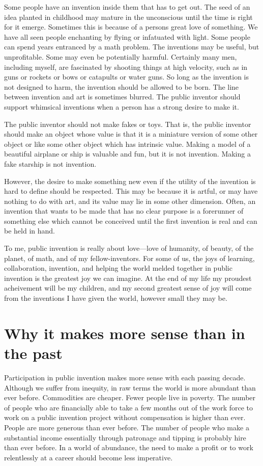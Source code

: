 \documentclass[
	fontsize=10pt, %
	twoside=false, %
	secnumdepth=1, %
]{kaobook}
\begin{document}
Some people have an invention inside them that has to get out.
The seed of an idea planted in childhood may mature in the unconscious
until the time is right for it emerge.
Sometimes this is because of a persons great love of something.
We have all seen people enchanting by flying or
infatuated with light.
Some people can spend years entranced by a math problem.
The inventions may be useful, but unprofitable.
Some may even be potentially harmful. Certainly many men,
including myself, are fascinated by shooting things at
high velocity, such as in guns or rockets or bows
or catapults or water guns.
So long as the invention is not designed to harm,
the invention should be allowed to be born.
The line between invention and art is sometimes blurred.
The public inventor should support whimsical inventions
when a person has a strong desire to make it.

The public inventor should not make fakes or toys.
That is, the public inventor should make an object
whose value is that it is a miniature version of some
other object or like some other object which has intrinsic value.
Making a model of a beautiful airplane or ship is valuable
and fun, but it is not invention.
Making a fake starship is not invention.

However, the desire to make something new even if the
utility of the invention is hard to define should be
respected. This may be because it is artful, or may
have nothing to do with art, and its value may lie
in some other dimension.
Often, an invention that wants to be made that has
no clear purpose is a forerunner of something else
which cannot be conceived until the first invention
is real and can be held in hand.

To me, public invention is really about love---love of humanity,
of beauty, of the planet, of math, and of my fellow-inventors.
For some of us, the joys of learning, collaboration, invention,
and helping the world melded together in public invention
is the greatest joy we can imagine.
At the end of my life my proudest acheivement will be my children,
and my second greatest sense of joy will come from the
inventions I have given the world, however small they may be.

\chapter{Why it makes more sense than in the past}

Participation in public invention makes more sense with
each passing decade.
Although we suffer from inequity, in raw terms the world
is more abundant than ever before.
Commodities are cheaper.
Fewer people live in poverty.
The number of people who are financially able to take
a few months out of the work force to work on a public invention
project without compensation is higher than ever.
People are more generous than ever before.
The number of people who make a substantial income
essentially through patronage and tipping is probably
hire than ever before.
In a world of abundance, the need to make a profit
or to work relentlessly at a career should
become less imperative.
\end{document}
